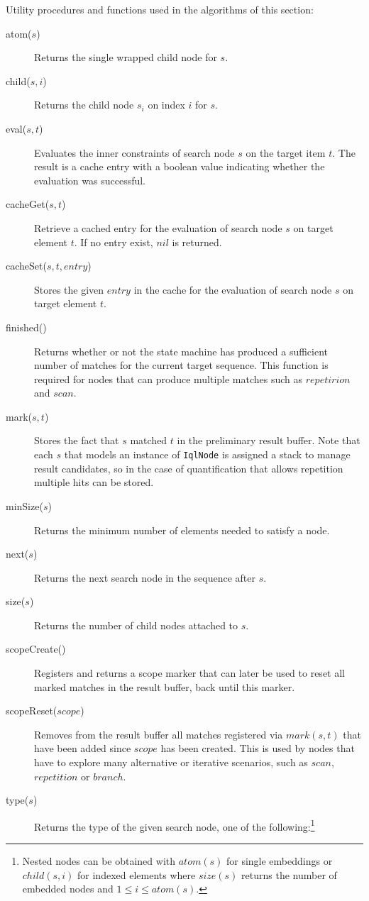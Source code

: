 \documentclass[11pt,a4paper]{report}
\newcommand{\iqlType}[1]{\texttt{\iqlns#1}}
\begin{document}
Utility procedures and functions used in the algorithms of this section:
\begin{description}
	\item[atom($s$)] Returns the single wrapped child node for $s$. 
	\item[child($s, i$)] Returns the child node $s_i$ on index $i$ for $s$. 
	\item[eval($s,t$)] Evaluates the inner constraints of search node $s$ on the target item $t$. The result is a cache entry with a boolean value indicating whether the evaluation was successful.
	\item[cacheGet($s,t$)] Retrieve a cached entry for the evaluation of search node $s$ on target element $t$. If no entry exist, $nil$ is returned.
	\item[cacheSet($s, t, entry$)] Stores the given $entry$ in the cache for the evaluation of search node $s$ on target element $t$.  
	\item[finished()] Returns whether or not the state machine has produced a sufficient number of matches for the current target sequence. This function is required for nodes that can produce multiple matches such as $repetirion$ and $scan$.
	\item[mark($s,t$)] Stores the fact that $s$ matched $t$ in the preliminary result buffer. Note that each $s$ that models an instance of \iqlType{IqlNode} is assigned a stack to manage result candidates, so in the case of quantification that allows repetition multiple hits can be stored.
	\item[minSize($s$)] Returns the minimum number of elements needed to satisfy a node.
	\item[next($s$)] Returns the next search node in the sequence after $s$.
	\item[size($s$)] Returns the number of child nodes attached to $s$.
	\item[scopeCreate()] Registers and returns a scope marker that can later be used to reset all marked matches in the result buffer, back until this marker.
	\item[scopeReset($scope$)] Removes from the result buffer all matches registered via $mark(s,t)$ that have been added since $scope$ has been created. This is used by nodes that have to explore many alternative or iterative scenarios, such as $scan$, $repetition$ or $branch$.
	\item[type($s$)] Returns the type of the given search node, one of the following:\footnote{Nested nodes can be obtained with $atom(s)$ for single embeddings or $child(s,i)$ for indexed elements where $size(s)$ returns the number of embedded nodes and $1 \leq i \leq atom(s)$.}

\end{description}
\end{document}
